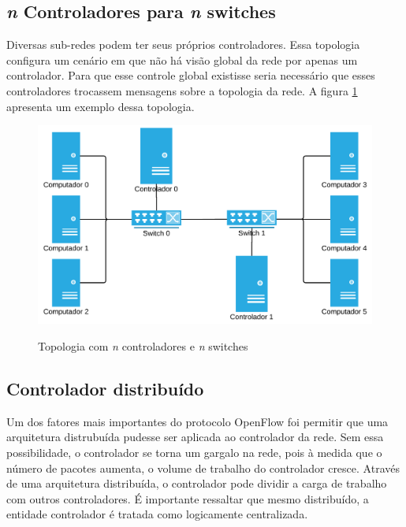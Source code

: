 \subsection{\emph{n} Controladores para \emph{n} switches}

Diversas sub-redes podem ter seus próprios controladores.
Essa topologia configura um cenário em que não há visão global da rede 
por apenas um controlador. 
Para que esse controle global existisse seria necessário que esses 
controladores trocassem mensagens sobre a topologia da rede.
A figura \ref{fig:n-controllers-n-switches} apresenta um exemplo dessa 
topologia.

\begin{figure}[h!]
    \centering
    \includegraphics[scale=0.9]{img/n-controllers-n-switches}
    \label{fig:n-controllers-n-switches}
    \caption{Topologia com \emph{n} controladores e \emph{n} switches}
\end{figure}


\subsection{Controlador distribuído}

Um dos fatores mais importantes do protocolo OpenFlow foi permitir que 
uma arquitetura distrubuída pudesse ser aplicada ao controlador da rede.
Sem essa possibilidade, o controlador se torna um gargalo na rede, 
pois à medida que o número de pacotes aumenta, o volume de trabalho do 
controlador cresce. 
Através de uma arquitetura distribuída, o controlador pode dividir a carga 
de trabalho com outros controladores.
É importante ressaltar que mesmo distribuído, a entidade controlador
é tratada como logicamente centralizada.

